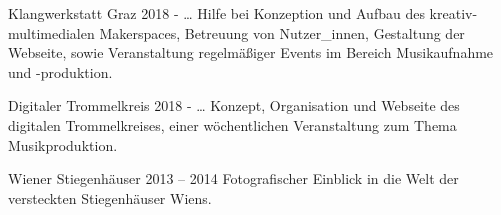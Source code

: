 %
%

\begin{projects}
	\project
	{Klangwerkstatt Graz}
	{2018 - …}
	{}
	{
		Hilfe bei Konzeption und Aufbau des kreativ-multimedialen Makerspaces,
		Betreuung von Nutzer\_innen, Gestaltung der Webseite, sowie
		Veranstaltung regelmäßiger Events im Bereich Musikaufnahme und
		-produktion.
	}
	{}

	\project
	{Digitaler Trommelkreis}
	{2018 - …}
	{}
	{
		Konzept, Organisation und Webseite des digitalen Trommelkreises, einer
		wöchentlichen Veranstaltung zum Thema Musikproduktion.
	}
	{}

	\project
	{Wiener Stiegenhäuser}
	{2013 – 2014}
	{}
	{
		Fotografischer Einblick in die Welt der versteckten Stiegenhäuser Wiens.
	}
	{}
\end{projects}
